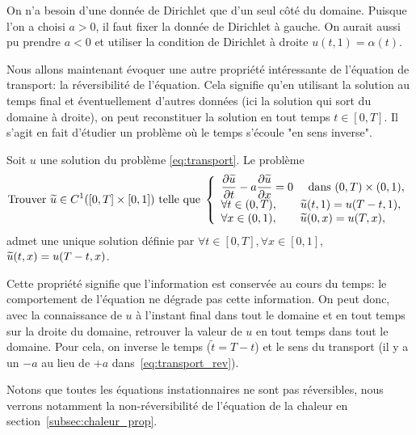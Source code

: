 \documentclass[12pt,a4paper,twoside]{article}
\begin{document}
\begin{remark}
  On n'a besoin d'une donn\'ee de Dirichlet que d'un seul c\^ot\'e du domaine.
  Puisque l'on a choisi $a > 0$, il faut fixer la donn\'ee de Dirichlet \`a gauche.
  On aurait aussi pu prendre $a < 0$ et utiliser la condition de Dirichlet \`a droite
  $u(t,1) = \alpha(t)$.
\end{remark}


Nous allons maintenant \'evoquer une autre propri\'et\'e int\'eressante de l'\'equation
de transport: la r\'eversibilit\'e de l'\'equation.
Cela signifie qu'en utilisant la solution au temps final et \'eventuellement d'autres donn\'ees
(ici la solution qui sort du domaine \`a droite), on peut reconstituer la solution
en tout temps $t \in [0,T]$.
Il s'agit en fait d'\'etudier un probl\`eme o\`u le temps s'\'ecoule 
"en sens inverse".

\begin{proposition}
  \label{prop:transport_rev}
  Soit $u$ une solution du probl\`eme \eqref{eq:transport}.
  Le probl\`eme
  \begin{equation}
    \label{eq:transport_rev}
    \text{Trouver $\widetilde{u} \in C^1([0,T] \times [0,1] )$ telle que} \;
    \left\{
      \begin{array}{l}
        \dfrac{\partial \widetilde{u}}{\partial t} - a \dfrac{\partial \widetilde{u}}{\partial x} = 0 
        \quad \text{ dans } (0,T) \times (0,1),
        \\
        \forall t \in (0,T), \qquad \widetilde{u}(t,1) = u(T-t,1) ,
        \\
        \forall x \in (0,1), \qquad \widetilde{u}(0,x) = u(T,x) ,
      \end{array}
    \right.
  \end{equation}
  admet une unique solution d\'efinie par
  $\forall t \in [0,T], \forall x \in [0,1]$, 
  $\widetilde{u}(t,x) = u(T-t,x)$. 
\end{proposition}

Cette propri\'et\'e signifie que l'information est conserv\'ee au cours du temps:
le comportement de l'\'equation ne d\'egrade pas cette information.
On peut donc, avec la connaissance de $u$ \`a l'instant final dans tout le domaine 
et en tout temps sur la droite du domaine, retrouver la valeur de $u$ en tout temps dans tout le domaine.
Pour cela, on inverse le temps ($\tilde{t} = T - t$) et le sens du transport
(il y a un $-a$ au lieu de $+a$ dans~\eqref{eq:transport_rev}).

Notons que toutes les \'equations instationnaires ne sont pas r\'eversibles, 
nous verrons notamment la non-r\'eversibilit\'e de l'\'equation de la chaleur
en section~\ref{subsec:chaleur_prop}.
\end{document}
